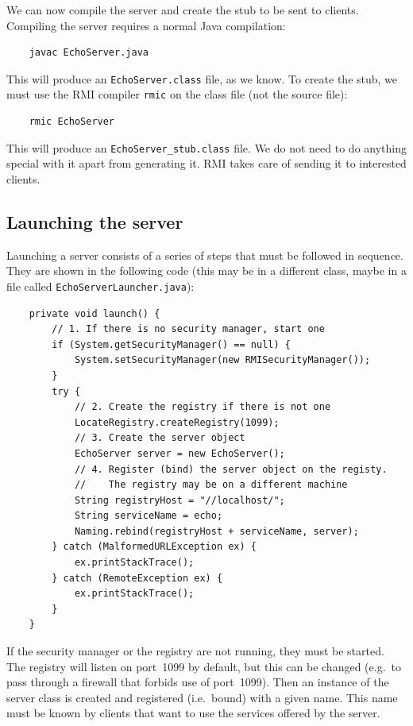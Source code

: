 We can now compile the server and create the stub to be sent to
clients. Compiling the server requires a normal Java compilation: 

\begin{verbatim}
    javac EchoServer.java
\end{verbatim}

This will produce an \verb+EchoServer.class+ file, as we know. To
create the stub, we must use the RMI compiler \verb+rmic+ 
on the class file (not the source file):

\begin{verbatim}
    rmic EchoServer
\end{verbatim}

This will produce an \verb+EchoServer_stub.class+ file. We do not need
to do anything special with it apart from generating it. RMI takes
care of sending it to interested clients. 

\subsection{Launching the server}
\label{sec:launching-server}

Launching a server consists of a series of steps that must be followed
in sequence. They are shown in the following code (this may be in a
different class, maybe in a file called \verb+EchoServerLauncher.java+): 

\begin{verbatim}
    private void launch() {
        // 1. If there is no security manager, start one
        if (System.getSecurityManager() == null) {
            System.setSecurityManager(new RMISecurityManager());
        }
        try {
            // 2. Create the registry if there is not one
            LocateRegistry.createRegistry(1099);
            // 3. Create the server object
            EchoServer server = new EchoServer();
            // 4. Register (bind) the server object on the registy. 
            //    The registry may be on a different machine
            String registryHost = "//localhost/";
            String serviceName = echo;
            Naming.rebind(registryHost + serviceName, server);
        } catch (MalformedURLException ex) {
            ex.printStackTrace();
        } catch (RemoteException ex) {
            ex.printStackTrace();
        }
    }
\end{verbatim}

If the security manager or the registry are not running, they must be
started. The registry will listen on port~1099 by default, but this
can be changed (e.g.~to pass through a firewall that forbids use of
port~1099). Then an instance of the server class is created and
registered (i.e.~bound) with a given name. This name must be known by
clients that want to use the services offered by the server.

